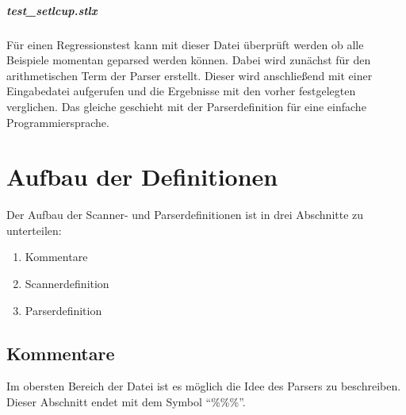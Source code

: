 \paragraph{test\_setlcup.stlx} Für einen Regressionstest kann mit dieser Datei überprüft werden ob alle Beispiele momentan geparsed werden können. Dabei wird zunächst für den arithmetischen Term der Parser erstellt. Dieser wird anschließend mit einer Eingabedatei aufgerufen und die Ergebnisse mit den vorher festgelegten verglichen. Das gleiche geschieht mit der Parserdefinition für eine einfache Programmiersprache.
\chapter{Aufbau der Definitionen}

Der Aufbau der Scanner- und Parserdefinitionen ist in drei Abschnitte zu unterteilen:
\begin{enumerate}
	\item Kommentare
	\item Scannerdefinition
	\item Parserdefinition
\end{enumerate}
\section{Kommentare}
Im obersten Bereich der Datei ist es möglich die Idee des Parsers zu beschreiben.
Dieser Abschnitt endet mit dem Symbol "`\%\%\%"'. 
